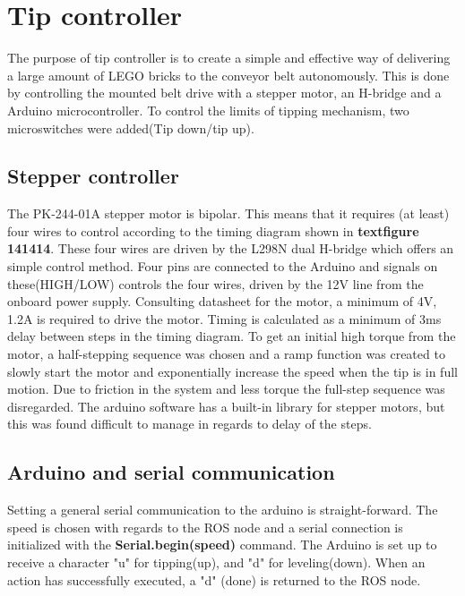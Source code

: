 \section{Tip controller} %
\label{sec:mr_tip_controller}

The purpose of tip controller is to create a simple and effective way of 
delivering a large amount of LEGO bricks to the conveyor belt autonomously. 
This is done by controlling the mounted belt drive with a stepper motor, an 
H-bridge and a Arduino microcontroller. To control the limits of tipping 
mechanism, two microswitches were added(Tip down/tip up).\\
\subsection{Stepper controller} %
\label{sub:stepper_controller}
The PK-244-01A stepper motor is bipolar. This means that it requires (at least) 
four wires to control according to the timing diagram shown in 
\textbf{textfigure 141414}. These four wires are driven by the L298N dual 
H-bridge which offers an simple control method. Four pins are connected to the 
Arduino and signals on these(HIGH/LOW) controls the four wires, driven by the 
12V line from the onboard power supply.  Consulting datasheet for the motor, a 
minimum of 
4V, 1.2A is required to drive the motor. Timing is calculated as a minimum of 
3ms delay between steps in the timing diagram. To get an initial high torque 
from the motor, a half-stepping sequence was chosen and a ramp function was 
created to slowly start the motor and exponentially increase the speed when the 
tip is in full motion. Due to friction in the system and less torque the 
full-step sequence was disregarded. The arduino software has a built-in library 
for stepper motors, but this was found difficult to manage in regards to delay 
of the steps. 

\subsection{Arduino and serial communication} %
\label{sub:arduino_and_serial_communication}
Setting a general serial communication to the arduino is straight-forward. The 
speed is chosen with regards to the ROS node and a serial connection is 
initialized with the \textbf{Serial.begin(speed)} command. The Arduino is set 
up to 
receive a character "u" for tipping(up), and "d" for leveling(down). When an 
action has successfully executed, a "d" (done) is returned to the ROS node.


